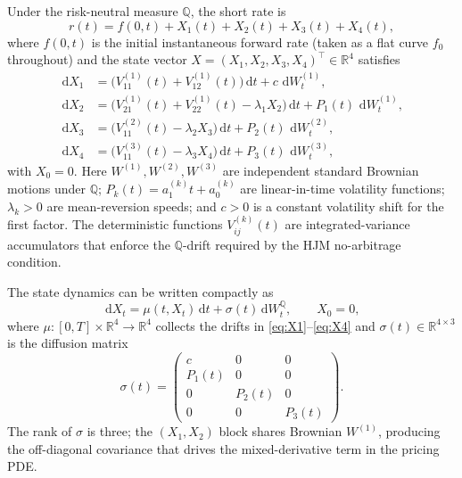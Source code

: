 \documentclass[11pt,a4paper]{article}
\newcommand{\Q}{\mathbb{Q}}
\newcommand{\R}{\mathbb{R}}
\newcommand{\dd}{\,\mathrm{d}}
\newcommand{\dW}{\dd W^{\Q}}
\begin{document}
Under the risk-neutral measure $\Q$, the short rate is
\begin{equation}
  r(t) = f(0,t) + X_1(t) + X_2(t) + X_3(t) + X_4(t),
\end{equation}
where $f(0,t)$ is the initial instantaneous forward rate (taken as a flat
curve $f_0$ throughout) and the state vector
$X = (X_1, X_2, X_3, X_4)^\top \in \R^4$ satisfies
\begin{align}
  \dd X_1 &= \bigl(V_{11}^{(1)}(t) + V_{12}^{(1)}(t)\bigr)\dd t
             + c\,\dd W^{(1)}_t, \label{eq:X1}\\
  \dd X_2 &= \bigl(V_{21}^{(1)}(t) + V_{22}^{(1)}(t) - \lambda_1 X_2\bigr)\dd t
             + P_1(t)\,\dd W^{(1)}_t, \label{eq:X2}\\
  \dd X_3 &= \bigl(V_{11}^{(2)}(t) - \lambda_2 X_3\bigr)\dd t
             + P_2(t)\,\dd W^{(2)}_t, \label{eq:X3}\\
  \dd X_4 &= \bigl(V_{11}^{(3)}(t) - \lambda_3 X_4\bigr)\dd t
             + P_3(t)\,\dd W^{(3)}_t, \label{eq:X4}
\end{align}
with $X_0 = 0$. Here $W^{(1)}, W^{(2)}, W^{(3)}$ are independent standard
Brownian motions under $\Q$; $P_k(t) = a_1^{(k)} t + a_0^{(k)}$ are
linear-in-time volatility functions; $\lambda_k > 0$ are mean-reversion
speeds; and $c > 0$ is a constant volatility shift for the first factor. The
deterministic functions $V_{ij}^{(k)}(t)$ are integrated-variance accumulators
that enforce the $\Q$-drift required by the HJM no-arbitrage condition.

The state dynamics can be written compactly as
\begin{equation}
  \dd X_t = \mu(t, X_t)\dd t + \sigma(t)\dW_t, \qquad X_0 = 0,
  \label{eq:X}
\end{equation}
where $\mu: [0,T] \times \R^4 \to \R^4$ collects the drifts in
\eqref{eq:X1}--\eqref{eq:X4} and $\sigma(t) \in \R^{4 \times 3}$ is the
diffusion matrix
\begin{equation}
  \sigma(t) =
  \begin{pmatrix}
    c    & 0      & 0      \\
    P_1(t) & 0    & 0      \\
    0    & P_2(t) & 0      \\
    0    & 0      & P_3(t)
  \end{pmatrix}.
\end{equation}
The rank of $\sigma$ is three; the $(X_1, X_2)$ block shares Brownian
$W^{(1)}$, producing the off-diagonal covariance that drives the
mixed-derivative term in the pricing PDE.
\end{document}
